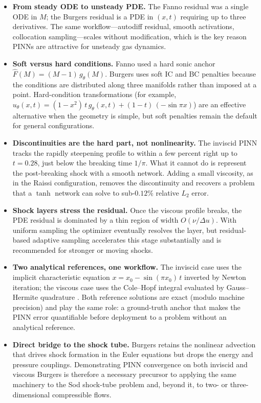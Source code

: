 \documentclass[11pt,a4paper]{report}
\begin{document}
\begin{itemize}
    \item \textbf{From steady ODE to unsteady PDE.} The Fanno residual was a single ODE in $M$; the Burgers residual is a PDE in $(x, t)$ requiring up to three derivatives. The same workflow---autodiff residual, smooth activations, collocation sampling---scales without modification, which is the key reason PINNs are attractive for unsteady gas dynamics.
    \item \textbf{Soft versus hard conditions.} Fanno used a hard sonic anchor $\hat{F}(M) = (M-1)\,g_{\theta}(M)$. Burgers uses soft IC and BC penalties because the conditions are distributed along three manifolds rather than imposed at a point. Hard-condition transformations (for example, $u_{\theta}(x,t) = (1-x^{2})\,t\,g_{\theta}(x,t) + (1-t)\,(-\sin\pi x)$) are an effective alternative when the geometry is simple, but soft penalties remain the default for general configurations.
    \item \textbf{Discontinuities are the hard part, not nonlinearity.} The inviscid PINN tracks the rapidly steepening profile to within a few percent right up to $t = 0.28$, just below the breaking time $1/\pi$. What it cannot do is represent the post-breaking shock with a smooth network. Adding a small viscosity, as in the Raissi configuration, removes the discontinuity and recovers a problem that a $\tanh$ network can solve to sub-$0.12\%$ relative $L_{2}$ error.
    \item \textbf{Shock layers stress the residual.} Once the viscous profile breaks, the PDE residual is dominated by a thin region of width $O(\nu/\Delta u)$. With uniform sampling the optimizer eventually resolves the layer, but residual-based adaptive sampling \cite{Lu2021hPINN} accelerates this stage substantially and is recommended for stronger or moving shocks.
    \item \textbf{Two analytical references, one workflow.} The inviscid case uses the implicit characteristic equation $x = x_{0} - \sin(\pi x_{0})\,t$ inverted by Newton iteration; the viscous case uses the Cole--Hopf integral evaluated by Gauss--Hermite quadrature \cite{Cole1951, Hopf1950}. Both reference solutions are exact (modulo machine precision) and play the same role: a ground-truth anchor that makes the PINN error quantifiable before deployment to a problem without an analytical reference.
    \item \textbf{Direct bridge to the shock tube.} Burgers retains the nonlinear advection that drives shock formation in the Euler equations but drops the energy and pressure couplings. Demonstrating PINN convergence on both inviscid and viscous Burgers is therefore a necessary precursor to applying the same machinery to the Sod shock-tube problem and, beyond it, to two- or three-dimensional compressible flows.
\end{itemize}
\end{document}
